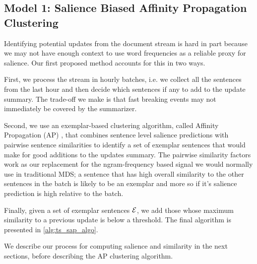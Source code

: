 \subsection{Model 1: Salience Biased Affinity Propagation Clustering}

  

  Identifying potential updates from the document stream is hard in part
  because we may not have enough context to use word frequencies as a 
  reliable proxy for salience. Our first proposed method accounts for this
  in two ways. 

  First, we process the stream in hourly batches, i.e. we collect all the
  sentences from the last hour and then decide which sentences if any to
  add to the update summary. The trade-off we make is that fast breaking
  events may not immediately be covered by the summarizer.

  Second, we use an exemplar-based clustering algorithm,
  called Affinity Propagation (AP) \citep{frey2007clustering}, that combines
  sentence level salience predictions with pairwise sentence similarities
  to identify a set of exemplar sentences that would make for good 
  additions to the updates summary. The pairwise similarity factors work 
  as our replacement for the ngram-frequency based signal we would normally 
  use in traditional MDS; a sentence that has high overall similarity to
  the other sentences in the batch is likely to be an exemplar and
  more so if it's salience prediction is high relative to the batch.

  Finally, given a set of exemplar sentences $\mathcal{E}$, we add those
  whose maximum similarity to a previous update is below a threshold.
  The final algorithm is presented in \autoref{alg:ts_sap_algo}.



  We describe our process for computing salience and similarity in
 the next sections, before describing the AP clustering algorithm.








